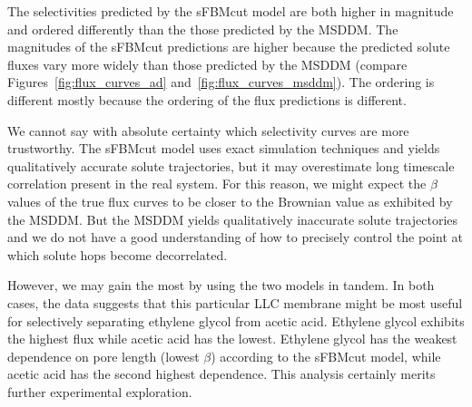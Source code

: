 \documentclass[12pt]{article}
\begin{document}
  The selectivities predicted by the sFBMcut model are both higher in magnitude and
  ordered differently than the those predicted by the MSDDM. The magnitudes of the
  sFBMcut predictions are higher because the predicted solute fluxes vary more widely
  than those predicted by the MSDDM (compare Figures~\ref{fig:flux_curves_ad} 
  and~\ref{fig:flux_curves_msddm}). The ordering is different mostly because the 
  ordering of the flux predictions is different. 
  
  We cannot say with absolute certainty which selectivity curves are more 
  trustworthy. The sFBMcut model uses exact simulation techniques and yields 
  qualitatively accurate solute trajectories, but it may overestimate long 
  timescale correlation present in the real system. For this reason, we might
  expect the $\beta$ values of the true flux curves to be closer to the 
  Brownian value as exhibited by the MSDDM. But the MSDDM yields qualitatively
  inaccurate solute trajectories and we do not have a good understanding of
  how to precisely control the point at which solute hops become decorrelated.
  
  However, we may gain the most by using the two models in tandem. In both cases,  
  the data suggests that this particular LLC membrane might be most useful for 
  selectively separating ethylene glycol from acetic acid. Ethylene glycol
  exhibits the highest flux while acetic acid has the lowest. Ethylene glycol
  has the weakest dependence on pore length (lowest $\beta$) according to the
  sFBMcut model, while acetic acid has the second highest dependence. This 
  analysis certainly merits further experimental exploration.

  
\end{document}
